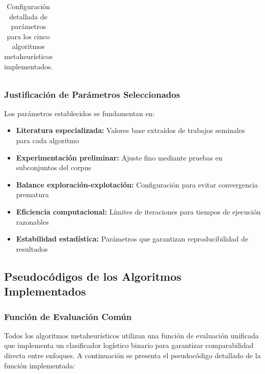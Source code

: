 \begin{table}[htbp]
{\begin{tabular}{|l|l|l|l|l|l|}
\hline
\end{tabular}
}
\caption{Configuración detallada de parámetros para los cinco algoritmos metaheurísticos implementados.}
\label{tab:configuracion_algoritmos_metaheuristicos}
\end{table}

\subsubsection{Justificación de Parámetros Seleccionados}

Los parámetros establecidos se fundamentan en:

\begin{itemize}
    \item \textbf{Literatura especializada:} Valores base extraídos de trabajos seminales para cada algoritmo
    \item \textbf{Experimentación preliminar:} Ajuste fino mediante pruebas en subconjuntos del corpus
    \item \textbf{Balance exploración-explotación:} Configuración para evitar convergencia prematura
    \item \textbf{Eficiencia computacional:} Límites de iteraciones para tiempos de ejecución razonables
    \item \textbf{Estabilidad estadística:} Parámetros que garantizan reproducibilidad de resultados
\end{itemize}

\subsection{Pseudocódigos de los Algoritmos Implementados}
\label{subsec:pseudocodigos_algoritmos}

\subsubsection{Función de Evaluación Común}

Todos los algoritmos metaheurísticos utilizan una función de evaluación unificada que implementa un clasificador logístico binario para garantizar comparabilidad directa entre enfoques. A continuación se presenta el pseudocódigo detallado de la función implementada:

